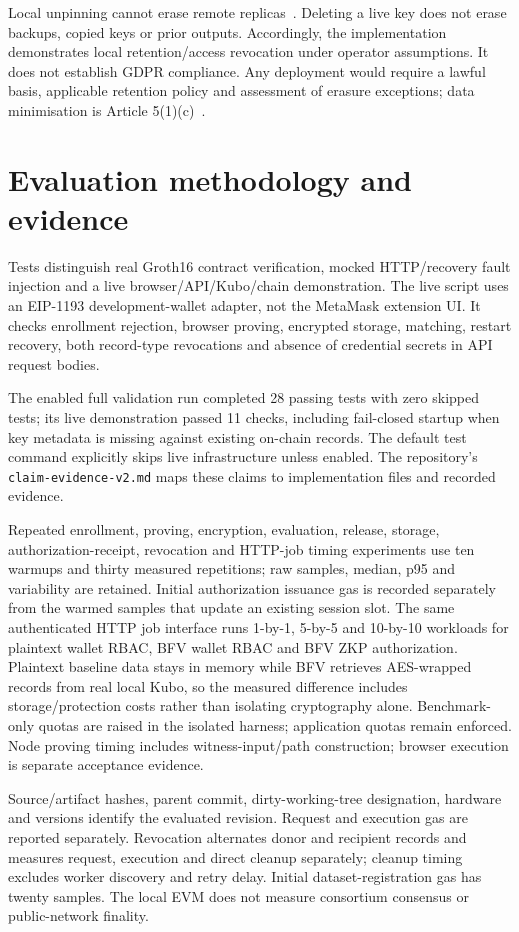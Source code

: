 \documentclass[11pt,a4paper]{article}
\begin{document}
Local unpinning cannot erase remote replicas~\cite{ipfs}. Deleting a live key does not erase backups, copied keys or prior outputs. Accordingly, the implementation demonstrates local retention/access revocation under operator assumptions. It does not establish GDPR compliance. Any deployment would require a lawful basis, applicable retention policy and assessment of erasure exceptions; data minimisation is Article 5(1)(c)~\cite{gdpr}.

\section{Evaluation methodology and evidence}
Tests distinguish real Groth16 contract verification, mocked HTTP/recovery fault injection and a live browser/API/Kubo/chain demonstration. The live script uses an EIP-1193 development-wallet adapter, not the MetaMask extension UI. It checks enrollment rejection, browser proving, encrypted storage, matching, restart recovery, both record-type revocations and absence of credential secrets in API request bodies.

The enabled full validation run completed 28 passing tests with zero skipped tests; its live demonstration passed 11 checks, including fail-closed startup when key metadata is missing against existing on-chain records. The default test command explicitly skips live infrastructure unless enabled. The repository's \texttt{claim-evidence-v2.md} maps these claims to implementation files and recorded evidence.

Repeated enrollment, proving, encryption, evaluation, release, storage, authorization-receipt, revocation and HTTP-job timing experiments use ten warmups and thirty measured repetitions; raw samples, median, p95 and variability are retained. Initial authorization issuance gas is recorded separately from the warmed samples that update an existing session slot. The same authenticated HTTP job interface runs 1-by-1, 5-by-5 and 10-by-10 workloads for plaintext wallet RBAC, BFV wallet RBAC and BFV ZKP authorization. Plaintext baseline data stays in memory while BFV retrieves AES-wrapped records from real local Kubo, so the measured difference includes storage/protection costs rather than isolating cryptography alone. Benchmark-only quotas are raised in the isolated harness; application quotas remain enforced. Node proving timing includes witness-input/path construction; browser execution is separate acceptance evidence.

Source/artifact hashes, parent commit, dirty-working-tree designation, hardware and versions identify the evaluated revision. Request and execution gas are reported separately. Revocation alternates donor and recipient records and measures request, execution and direct cleanup separately; cleanup timing excludes worker discovery and retry delay. Initial dataset-registration gas has twenty samples. The local EVM does not measure consortium consensus or public-network finality.
\end{document}
